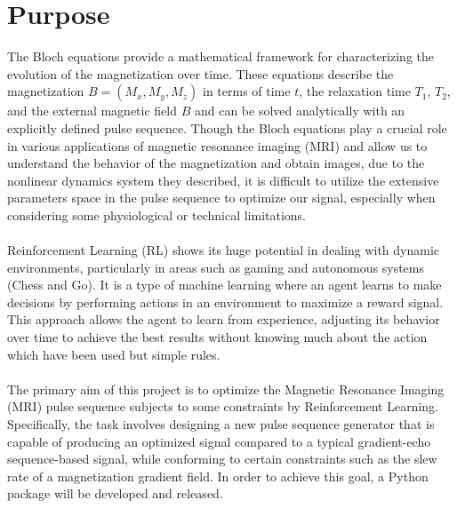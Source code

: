 \section{Purpose}
The Bloch equations provide a mathematical framework for characterizing the evolution of the magnetization over time. These equations describe the magnetization $B=(M_x, M_y, M_z)$ in terms of time $t$, the relaxation time $T_1$, $T_2$, and the external magnetic field $B$ and can be solved analytically with an explicitly defined pulse sequence. Though the Bloch equations play a crucial role in various applications of magnetic resonance imaging (MRI) and allow us to understand the behavior of the magnetization and obtain images, due to the nonlinear dynamics system they described, it is difficult to utilize the extensive parameters space in the pulse sequence to optimize our signal, especially when considering some physiological or technical limitations.
\\\\
Reinforcement Learning (RL) shows its huge potential in dealing with dynamic environments, particularly in areas such as gaming and autonomous systems (Chess and Go). It is a type of machine learning where an agent learns to make decisions by performing actions in an environment to maximize a reward signal. This approach allows the agent to learn from experience, adjusting its behavior over time to achieve the best results without knowing much about the action which have been used but simple rules.
\\\\
The primary aim of this project is to optimize the Magnetic Resonance Imaging (MRI) pulse sequence subjects to some constraints by Reinforcement Learning. Specifically, the task involves designing a new pulse sequence generator that is capable of producing an optimized signal compared to a typical gradient-echo sequence-based signal, while conforming to certain constraints such as the slew rate of a magnetization gradient field. In order to achieve this goal, a Python package will be developed and released.

